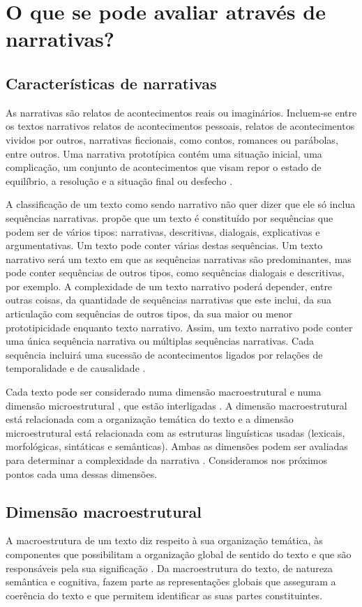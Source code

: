 \documentclass[output=paper,colorlinks,citecolor=brown,booklanguage=portuguese]{langscibook}
\begin{document}
\section{O que se pode avaliar através de narrativas?}\label{sec:doiscap16} \subsection{Características de narrativas} As narrativas são relatos de acontecimentos reais ou imaginários. Incluem-se entre os textos narrativos relatos de acontecimentos pessoais, relatos de acontecimentos vividos por outros, narrativas ficcionais, como contos, romances ou parábolas, entre outros. Uma narrativa prototípica contém uma situação inicial, uma complicação, um conjunto de acontecimentos que visam repor o estado de equilíbrio, a resolução e a situação final ou desfecho \citep{Adam1982, Sousa2010}.

A classificação de um texto como sendo narrativo não quer dizer que ele só inclua sequências narrativas. \citet{Adam1982, Adam1987} propõe que um texto é constituído por sequências que podem ser de vários tipos: narrativas, descritivas, dialogais, explicativas e argumentativas. Um texto pode conter várias destas sequências. Um texto narrativo será um texto em que as sequências narrativas são predominantes, mas pode conter sequências de outros tipos, como sequências dialogais e descritivas, por exemplo. A complexidade de um texto narrativo poderá depender, entre outras coisas, da quantidade de sequências narrativas que este inclui, da sua articulação com sequências de outros tipos, da sua maior ou menor prototipicidade enquanto texto narrativo. Assim, um texto narrativo pode conter uma única sequência narrativa ou múltiplas sequências narrativas. Cada sequência incluirá uma sucessão de acontecimentos ligados por relações de temporalidade e de causalidade \citep{Sousa2010}.

Cada texto pode ser considerado numa dimensão macroestrutural e numa dimensão microestrutural \citep{Beaugrande1983, Dijk1997}, que estão interligadas \citep{Liles1995, Pearson2002}. A dimensão macroestrutural está relacionada com a organização temática do texto e a dimensão microestrutural está relacionada com as estruturas linguísticas usadas (lexicais, morfológicas, sintáticas e semânticas). Ambas as dimensões podem ser avaliadas para determinar a complexidade da narrativa \citep{Westby2005, Monteiro2016}. Consideramos nos próximos pontos cada uma dessas dimensões.

\subsection{Dimensão macroestrutural} A macroestrutura de um texto diz respeito à sua organização temática, às componentes que possibilitam a organização global de sentido do texto e que são responsáveis pela sua significação \citep{Beaugrande1983}. Da macroestrutura do texto, de natureza semântica e cognitiva, fazem parte as representações globais que asseguram a coerência do texto \citep{Sautchuk2003} e que permitem identificar as suas partes constituintes.
\end{document}

